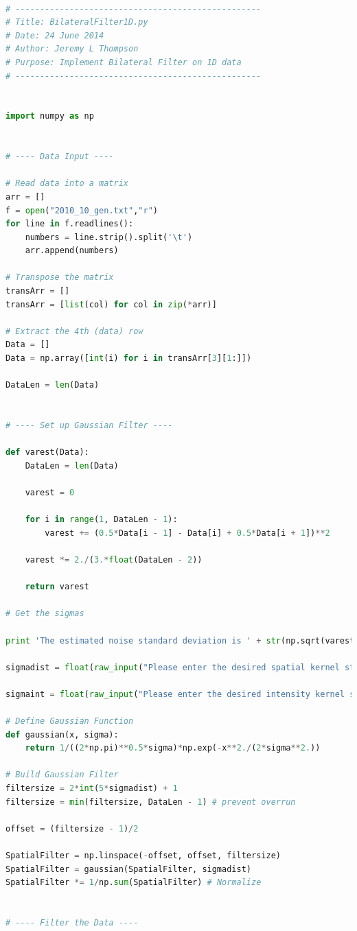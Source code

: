 \documentclass[11pt]{article}
\theoremstyle{definition}
\begin{document}
\begin{lstlisting}[language = Python]

# --------------------------------------------------
# Title: BilateralFilter1D.py
# Date: 24 June 2014
# Author: Jeremy L Thompson
# Purpose: Implement Bilateral Filter on 1D data
# --------------------------------------------------


import numpy as np


# ---- Data Input ----

# Read data into a matrix
arr = []
f = open("2010_10_gen.txt","r")
for line in f.readlines():
    numbers = line.strip().split('\t')
    arr.append(numbers)

# Transpose the matrix
transArr = []
transArr = [list(col) for col in zip(*arr)]

# Extract the 4th (data) row
Data = []
Data = np.array([int(i) for i in transArr[3][1:]])

DataLen = len(Data)


# ---- Set up Gaussian Filter ----

def varest(Data):
    DataLen = len(Data)

    varest = 0

    for i in range(1, DataLen - 1):
        varest += (0.5*Data[i - 1] - Data[i] + 0.5*Data[i + 1])**2

    varest *= 2./(3.*float(DataLen - 2))

    return varest

# Get the sigmas

print 'The estimated noise standard deviation is ' + str(np.sqrt(varest(Data)))

sigmadist = float(raw_input("Please enter the desired spatial kernel standard deviation: "))

sigmaint = float(raw_input("Please enter the desired intensity kernel standard deviation: "))

# Define Gaussian Function
def gaussian(x, sigma):
    return 1/((2*np.pi)**0.5*sigma)*np.exp(-x**2./(2*sigma**2.))

# Build Gaussian Filter
filtersize = 2*int(5*sigmadist) + 1
filtersize = min(filtersize, DataLen - 1) # prevent overrun

offset = (filtersize - 1)/2

SpatialFilter = np.linspace(-offset, offset, filtersize)
SpatialFilter = gaussian(SpatialFilter, sigmadist)
SpatialFilter *= 1/np.sum(SpatialFilter) # Normalize


# ---- Filter the Data ----


\end{lstlisting}
\end{document}
